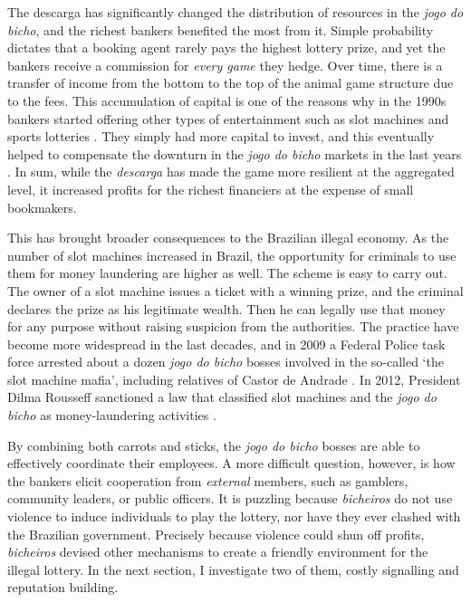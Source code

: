 \documentclass[a4paper,12pt]{article}
\begin{document}
The descarga has significantly changed the distribution of resources in the \emph{jogo do bicho}, and the richest bankers benefited the most from it. Simple probability dictates that a booking agent rarely pays the highest lottery prize, and yet the bankers receive a commission for \emph{every game} they hedge. Over time, there is a transfer of income from the bottom to the top of the animal game structure due to the fees. This accumulation of capital is one of the reasons why in the 1990s bankers started offering other types of entertainment such as slot machines and sports lotteries \citep{estado2006cacaniquel,globo2015cacaniquel,terra2011cacaniquel}. They simply had more capital to invest, and this eventually helped to compensate the downturn in the \textit{jogo do bicho} markets in the last years \citep{globo2017castor}. In sum, while the \textit{descarga} has made the game more resilient at the aggregated level, it increased profits for the richest financiers at the expense of small bookmakers.

This has brought broader consequences to the Brazilian illegal economy. As the number of slot machines increased in Brazil, the opportunity for criminals to use them for money laundering are higher as well. The scheme is easy to carry out. The owner of a slot machine issues a ticket with a winning prize, and the criminal declares the prize as his legitimate wealth. Then he can legally use that money for any purpose without raising suspicion from the authorities. The practice have become more widespread in the last decades, and in 2009 a Federal Police task force arrested about a dozen \textit{jogo do bicho} bosses involved in the so-called `the slot machine mafia', including relatives of Castor de Andrade \citep{estado2011cacaniquel}. In 2012, President Dilma Rousseff sanctioned a law that classified slot machines and the \textit{jogo do bicho} as money-laundering activities \citep{agenciabrasil2012dilma}.

 

By combining both carrots and sticks, the \textit{jogo do bicho} bosses are able to effectively coordinate their employees. A more difficult question, however, is how the bankers elicit cooperation from \textit{external} members, such as gamblers, community leaders, or public officers. It is puzzling because \textit{bicheiros} do not use violence to induce individuals to play the lottery, nor have they ever clashed with the Brazilian government. Precisely because violence could shun off profits, \textit{bicheiros} devised other mechanisms to create a friendly environment for the illegal lottery. In the next section, I investigate two of them, costly signalling and reputation building. 
\end{document}

